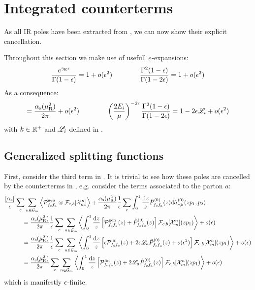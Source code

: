 \section{Integrated counterterms}

As all IR poles have been extracted from , we can now show their explicit cancellation.

Throughout this section we make use of usefull $ \epsilon $-expansions:
\begin{equation}
  \frac{e^{\gamma_\text{E}\epsilon}}{\Gamma(1-\epsilon)} = 1 + o(\epsilon^2)
  \qquad \qquad
  \frac{\Gamma^2(1-\epsilon)}{\Gamma(1-2\epsilon)} = 1 + o(\epsilon^2)
\end{equation}
As a consequence:
\begin{equation}
  [\rc] = \frac{\rcr}{2\pi} + \smo(\de^2)
  \qquad \qquad
  \left( \frac{2E_i}{\mu} \right)^{-2\de} \frac{\Gamma^2(1-\de)}{\Gamma(1-2\de)} = 1 - 2 \de \ler_i + \smo(\de^2)
\end{equation}
with $ k \in \mathbb{R}^+ $ and $ \mathscr{L}_i $ defined in .

\subsection{Generalized splitting functions}

First, consider the third term in . It is trivial to see how these poles are cancelled by the counterterms in , e.g. consider the terms associated to the parton $ a $:
\begin{equation*}
  \begin{split}
    & \frac{[\alpha_\text{s}]}{\epsilon} \sum_c \sum_{n \in \mathcal{G}_m} \left\langle \mathcal{P}^\text{gen}_{f_c f_a} \otimes \mathcal{F}_{c,b}[\mathcal{X}^{n}_{m}] \right\rangle + \frac{\alpha_\text{s}(\mu_\text{R}^2)}{2\pi} \frac{1}{\epsilon} \sum_c \int_0^1 \frac{\mathrm{d} z}{z} \hat{P}^{(0)}_{f_c f_a}(z) \mathrm{d}\hat{\sigma}^{(0)}_{c,b}(zp_1 , p_2) \\
    & \qquad \quad = \frac{\alpha_\text{s}(\mu_\text{R}^2)}{2\pi} \frac{1}{\epsilon} \sum_c \sum_{n \in \mathcal{G}_m} \left\langle \int_0^1 \frac{\mathrm{d} z}{z} \left[ \mathcal{P}^\text{gen}_{f_c f_a}(z) + \hat{P}^{(0)}_{f_c f_a}(z) \right] \mathcal{F}_{c,b}[\mathcal{X}^{n}_{m}](zp_1) \right\rangle + o(\epsilon) \\
    & \qquad \quad = \frac{\alpha_\text{s}(\mu_\text{R}^2)}{2\pi} \frac{1}{\epsilon} \sum_c \sum_{n \in \mathcal{G}_m} \left\langle \int_0^1 \frac{\mathrm{d} z}{z} \left[ \epsilon \mathcal{P}^\text{fin}_{f_c f_a}(z) + 2 \epsilon \mathscr{L}_a \hat{P}^{(0)}_{f_c f_a}(z) + o(\epsilon^2) \right] \mathcal{F}_{c,b}[\mathcal{X}^{n}_{m}](zp_1) \right\rangle + o(\epsilon) \\
    & \qquad \quad = \frac{\alpha_\text{s}(\mu_\text{R}^2)}{2\pi} \sum_c \sum_{n \in \mathcal{G}_m} \left\langle \int_0^1 \frac{\mathrm{d} z}{z} \left[ \mathcal{P}^\text{fin}_{f_c f_a}(z) + 2 \mathscr{L}_a \hat{P}^{(0)}_{f_c f_a}(z) \right] \mathcal{F}_{c,b}[\mathcal{X}^{n}_{m}](zp_1) \right\rangle + o(\epsilon) \\
  \end{split}
\end{equation*}
which is manifestly $ \epsilon $-finite.

